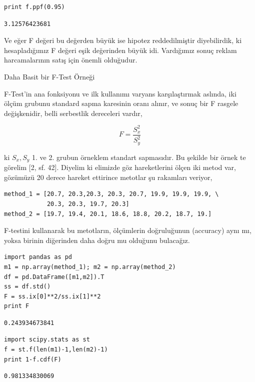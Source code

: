 \documentclass[12pt,fleqn]{article}\usepackage{../../common}
\begin{document}
\begin{verbatim}
print f.ppf(0.95)
\end{verbatim}

\begin{verbatim}
3.12576423681
\end{verbatim}

Ve eğer F değeri bu değerden büyük ise hipotez reddedilmiştir diyebilirdik,
ki hesapladığımız F değeri eşik değerinden büyük idi. Vardığımız sonuç
reklam harcamalarının satış için önemli olduğudur.

Daha Basit bir F-Test Örneği

F-Test'in ana fonksiyonu ve ilk kullanımı varyans karşılaştırmak aslında,
iki ölçüm grubunu standard sapma karesinin oranı alınır, ve sonuç bir F
rasgele değişkenidir, belli serbestlik dereceleri vardır,

$$ F = \frac{S_x^2}{S_y^2} $$

ki $S_x,S_y$ 1. ve 2. grubun örneklem standart sapmasıdır. Bu şekilde bir
örnek te görelim [2, sf. 42]. Diyelim ki elimizde göz hareketlerini ölçen
iki metod var, gözümüzü 20 derece hareket ettirince metotlar şu rakamları
veriyor,

\begin{verbatim}
method_1 = [20.7, 20.3,20.3, 20.3, 20.7, 19.9, 19.9, 19.9, \
            20.3, 20.3, 19.7, 20.3]
method_2 = [19.7, 19.4, 20.1, 18.6, 18.8, 20.2, 18.7, 19.]
\end{verbatim}

F-testini kullanarak bu metotların, ölçümlerin doğruluğunun (accuracy) aynı
mı, yoksa birinin diğerinden daha doğru mu olduğunu bulacağız. 

\begin{verbatim}
import pandas as pd
m1 = np.array(method_1); m2 = np.array(method_2)
df = pd.DataFrame([m1,m2]).T
ss = df.std()
F = ss.ix[0]**2/ss.ix[1]**2
print F
\end{verbatim}

\begin{verbatim}
0.243934673841
\end{verbatim}

\begin{verbatim}
import scipy.stats as st
f = st.f(len(m1)-1,len(m2)-1)
print 1-f.cdf(F)
\end{verbatim}

\begin{verbatim}
0.981334830069
\end{verbatim}
\end{document}
